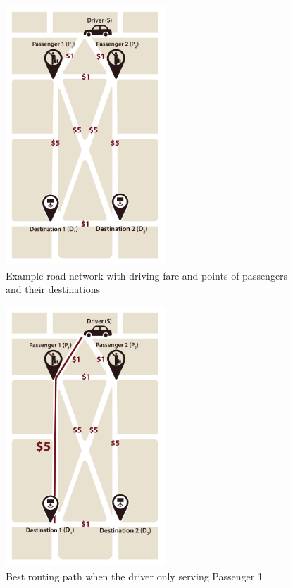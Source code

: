 \begin{figure}[htp]
  \centering
  \captionsetup{justification=centering}
  \includegraphics[width=6cm]{figures/mapV2.jpg}
  \caption{Example road network with driving fare and points of passengers and their destinations}
\end{figure}

\begin{figure}[htp]
  \centering
  \captionsetup{justification=centering}
  \includegraphics[width=6cm]{figures/mapV2_1.jpg}
  \caption{Best routing path when the driver only serving Passenger 1}
\end{figure}

